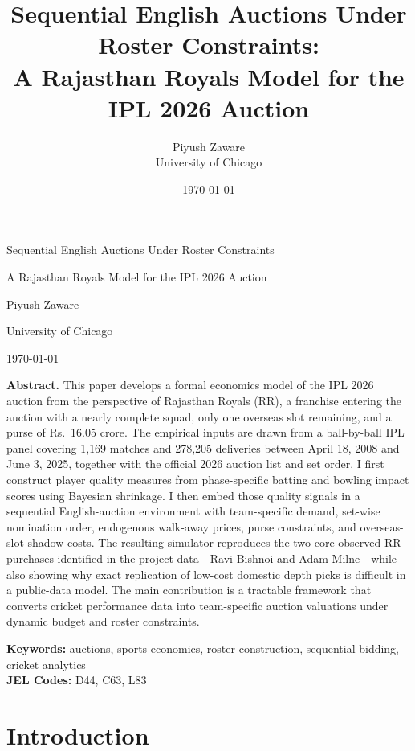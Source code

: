 \documentclass[11pt]{article}
\title{\textbf{Sequential English Auctions Under Roster Constraints:}\\
\textbf{A Rajasthan Royals Model for the IPL 2026 Auction}}
\author{Piyush Zaware\\University of Chicago}
\date{\today}
\begin{document}
\begin{titlepage}
\centering
{\Large Sequential English Auctions Under Roster Constraints\par}
\vspace{0.35cm}
{\Large A Rajasthan Royals Model for the IPL 2026 Auction\par}
\vspace{1.5cm}
{\normalsize Piyush Zaware\par}
{\normalsize University of Chicago\par}
\vspace{0.5cm}
{\normalsize \today\par}
\vfill
\begin{minipage}{0.9\textwidth}
\small
\textbf{Abstract.} This paper develops a formal economics model of the IPL 2026 auction from the perspective of Rajasthan Royals (RR), a franchise entering the auction with a nearly complete squad, only one overseas slot remaining, and a purse of Rs.\ 16.05 crore. The empirical inputs are drawn from a ball-by-ball IPL panel covering 1{,}169 matches and 278{,}205 deliveries between April 18, 2008 and June 3, 2025, together with the official 2026 auction list and set order. I first construct player quality measures from phase-specific batting and bowling impact scores using Bayesian shrinkage. I then embed those quality signals in a sequential English-auction environment with team-specific demand, set-wise nomination order, endogenous walk-away prices, purse constraints, and overseas-slot shadow costs. The resulting simulator reproduces the two core observed RR purchases identified in the project data---Ravi Bishnoi and Adam Milne---while also showing why exact replication of low-cost domestic depth picks is difficult in a public-data model. The main contribution is a tractable framework that converts cricket performance data into team-specific auction valuations under dynamic budget and roster constraints.
\end{minipage}
\vfill
\begin{minipage}{0.9\textwidth}
\small
\textbf{Keywords:} auctions, sports economics, roster construction, sequential bidding, cricket analytics\\
\textbf{JEL Codes:} D44, C63, L83
\end{minipage}
\end{titlepage}

\section{Introduction}
\end{document}
